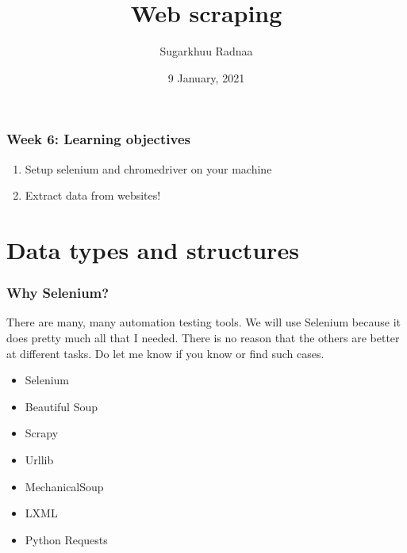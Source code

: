 \documentclass{beamer}
\title[Introduction to Python]{Web scraping}
\author{Sugarkhuu Radnaa}
\institute[]
{
Py4Econ in Ulaanbaatar \\ 
\medskip
\textit{py4econ@gmail.com} 
}
\date{9 January, 2021}  %
\begin{document}
\begin{frame}
\titlepage %
\end{frame}

\begin{frame}
    \frametitle{Week 6: Learning objectives}
    \begin{enumerate}
        \item Setup selenium and chromedriver on your machine
        \item Extract data from websites!
    \end{enumerate}
\end{frame}

\section{Data types and structures} 

\begin{frame}
    \frametitle{Why Selenium?}

    There are many, many automation testing tools. We will use Selenium because it does pretty much all that I needed. There is no reason
    that the others are better at different tasks. Do let me know if you know or find such cases. 

    \begin{itemize}
        \item Selenium
        \item Beautiful Soup
        \item Scrapy
        \item Urllib
        \item MechanicalSoup
        \item LXML
        \item Python Requests
    \end{itemize}
\end{frame}
\end{document}
